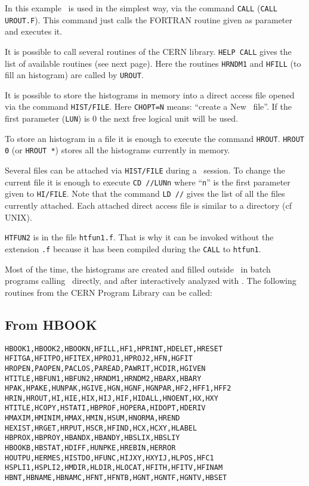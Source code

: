 \begin{DinglistE}
\item In this example \COMIS\ is used  in the simplest way, via the
      command {\tt CALL} ({\tt CALL UROUT.F}). This command just
      calls the FORTRAN routine given as parameter and executes it.
\item It is possible to call several routines of the CERN library. {\tt HELP
      CALL} gives the list of available routines (see next page). Here the
      routines {\tt HRNDM1} and {\tt HFILL} (to fill an histogram) are called
      by {\tt UROUT}. 
\item It is possible to store the histograms in memory into a direct access
      file opened via the command {\tt HIST/FILE}. Here {\tt CHOPT=N} means:
      ``create a New \HBOOK\ file''. If the first parameter ({\tt LUN})
      is 0 the next free logical unit will be used. 
\item To store an histogram in a file it is enough to execute the command
      {\tt HROUT}. {\tt HROUT 0} (or {\tt HROUT *}) stores all the
      histograms currently in memory.
\item Several files can be attached via {\tt HIST/FILE} during a \PAW\ session.
      To change the current file it is enough to execute {\tt CD //LUNn} 
      where ``{\tt n}'' is the first parameter given to 
      {\tt HI/FILE}. Note that the command {\tt LD //} gives the
      list of all the files currently attached. Each attached direct access 
      file is similar to a directory (cf UNIX).
\item {\tt HTFUN2} is in the file {\tt htfun1.f}. That is why it can be
      invoked without the extension {\tt .f} because it has been compiled
      during the {\tt CALL} to {\tt htfun1}.
\end{DinglistE}
Most of the time, the histograms are created and filled outside \PAW\
in batch programs calling \HBOOK\ directly, and after interactively
analyzed with \PAW.
\clearpage
The following routines from the CERN Program Library can be called:
\subsection*{From HBOOK}
\begin{alltt}
      HBOOK1,HBOOK2,HBOOKN,HFILL,HF1,HPRINT,HDELET,HRESET
      HFITGA,HFITPO,HFITEX,HPROJ1,HPROJ2,HFN,HGFIT
      HROPEN,PAOPEN,PACLOS,PAREAD,PAWRIT,HCDIR,HGIVEN
      HTITLE,HBFUN1,HBFUN2,HRNDM1,HRNDM2,HBARX,HBARY
      HPAK,HPAKE,HUNPAK,HGIVE,HGN,HGNF,HGNPAR,HF2,HFF1,HFF2
      HRIN,HROUT,HI,HIE,HIX,HIJ,HIF,HIDALL,HNOENT,HX,HXY
      HTITLE,HCOPY,HSTATI,HBPROF,HOPERA,HIDOPT,HDERIV
      HMAXIM,HMINIM,HMAX,HMIN,HSUM,HNORMA,HREND
      HEXIST,HRGET,HRPUT,HSCR,HFIND,HCX,HCXY,HLABEL
      HBPROX,HBPROY,HBANDX,HBANDY,HBSLIX,HBSLIY
      HBOOKB,HBSTAT,HDIFF,HUNPKE,HREBIN,HERROR
      HOUTPU,HERMES,HISTDO,HFUNC,HIJXY,HXYIJ,HLPOS,HFC1
      HSPLI1,HSPLI2,HMDIR,HLDIR,HLOCAT,HFITH,HFITV,HFINAM
      HBNT,HBNAME,HBNAMC,HFNT,HFNTB,HGNT,HGNTF,HGNTV,HBSET
\end{alltt}
